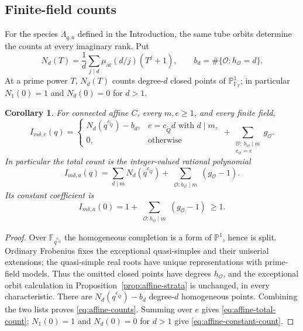 \documentclass[11pt, reqno]{amsart}
\numberwithin{equation}{section}
\newtheorem{corollary}[theorem]{Corollary}
\theoremstyle{definition}
\theoremstyle{remark}
\newcommand{\mr}[1]{\mathrm{#1}}
\newcommand{\mb}[1]{\mathbb{#1}}
\newcommand{\mc}[1]{\mathcal{#1}}
\newcommand{\OO}{\mc O}
\newcommand{\Qbar}{\widetilde Q}
\newcommand{\unfoldcomp}{{c_{\Qbar}}}
\begin{document}
\subsection{Finite-field counts}
For the species $\Lambda_{q,a}$ defined in the Introduction, the same tube
orbits determine the counts at every imaginary rank. Put
\[ N_d(T)=\frac1d\sum_{j\mid d}\mu_{\mr{ar}}(d/j)(T^j+1), \qquad b_d=\#\{\OO:h_{\OO}=d\}. \]
At a prime power $T$, $N_d(T)$ counts degree-$d$ closed points of
$\mb P^1_{\mb F_T}$; in particular $N_1(0)=1$ and $N_d(0)=0$
for $d>1$.

\begin{corollary}\label{cor:affine-counts}
For connected affine $C$, every $m,e\geq1$, and every finite field,
\begin{equation}\label{eq:affine-counts}
 I_{m\delta,e}(q)
 =\begin{cases}
   N_d(q^\unfoldcomp)-b_d,&e=\unfoldcomp d\text{ with }d\mid m,\\
   0,&\text{otherwise}
  \end{cases}
  +\sum_{\substack{\OO:\ h_{\OO}\mid m\\
                                e_{\OO}=e}}g_{\OO}.
\end{equation}
In particular the total count is the integer-valued rational
polynomial
\begin{equation}\label{eq:affine-total-count} I_{m\delta,a}(q) =\sum_{d\mid m}N_d(q^\unfoldcomp) +\sum_{\substack{\OO:h_{\OO}\mid m}} (g_{\OO}-1).\end{equation}
Its constant coefficient is
\begin{equation}\label{eq:affine-constant-count} I_{m\delta,a}(0)=1+ \sum_{\substack{\OO:h_{\OO}\mid m}} (g_{\OO}-1)\ \geq1.\end{equation}
\end{corollary}
\begin{proof}
Over $\mb F_{q^\unfoldcomp}$ the homogeneous completion is a form of
$\mb P^1$, hence is split. Ordinary Frobenius fixes the exceptional
quasi-simples and their uniserial extensions; the quasi-simple real roots
have unique representations with prime-field models. Thus the omitted
closed points have degrees $h_{\OO}$, and the exceptional orbit
calculation in Proposition~\ref{prop:affine-strata} is unchanged, in every
characteristic. There are $N_d(q^\unfoldcomp)-b_d$ degree-$d$ homogeneous points.
Combining the two lists proves \eqref{eq:affine-counts}. Summing over
$e$ gives \eqref{eq:affine-total-count}; $N_1(0)=1$ and $N_d(0)=0$
for $d>1$ give \eqref{eq:affine-constant-count}.
\end{proof}
\end{document}
